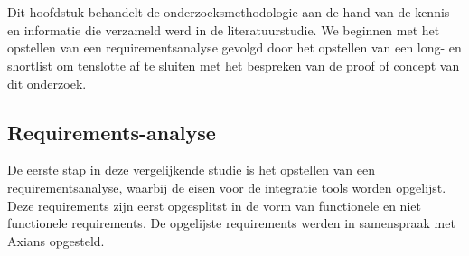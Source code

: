 
\chapter{}%
\label{ch:methodologie}


Dit hoofdstuk behandelt de onderzoeksmethodologie aan de hand van de kennis en informatie die verzameld werd in de literatuurstudie. We beginnen met het opstellen van een requirementsanalyse gevolgd door het opstellen van een long- en shortlist om tenslotte af te sluiten met het bespreken van de proof of concept van dit onderzoek.


\section{Requirements-analyse}
\label{sec:RequirementsAnalyseBP}

De eerste stap in deze vergelijkende studie is het opstellen van een requirementsanalyse, waarbij de eisen voor de integratie tools worden opgelijst. Deze requirements zijn eerst opgesplitst in de vorm van functionele en niet functionele requirements. De opgelijste requirements werden in samenspraak met Axians opgesteld.

